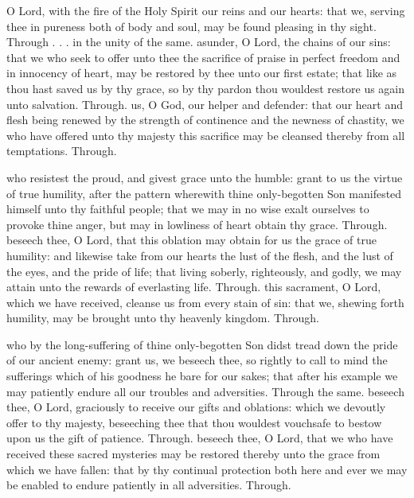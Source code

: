 \begin{multicols}{2}
 O Lord, with the fire of the Holy Spirit our reins and our hearts: that we, serving thee in pureness both of body and soul, may be found pleasing in thy sight. Through . . . in the unity of the same.
 asunder, O Lord, the chains of our sins: that we who seek to offer unto thee the sacrifice of praise in perfect freedom and in innocency of heart, may be restored by thee unto our first estate; that like as thou hast saved us by thy grace, so by thy pardon thou wouldest restore us again unto salvation. Through.
 us, O God, our helper and defender: that our heart and flesh being renewed by the strength of continence and the newness of chastity, we who have offered unto thy majesty this sacrifice may be cleansed thereby from all temptations. Through.

 who resistest the proud, and givest grace unto the humble: grant to us the virtue of true humility, after the pattern wherewith thine only-begotten Son manifested himself unto thy faithful people; that we may in no wise exalt ourselves to provoke thine anger, but may in lowliness of heart obtain thy grace. Through.
 beseech thee, O Lord, that this oblation may obtain for us the grace of true humility: and likewise take from our hearts the lust of the flesh, and the lust of the eyes, and the pride of life; that living soberly, righteously, and godly, we may attain unto the rewards of everlasting life. Through.
 this sacrament, O Lord, which we have received, cleanse us from every stain of sin: that we, shewing forth humility, may be brought unto thy heavenly kingdom. Through.

 who by the long-suffering of thine only-begotten Son didst tread down the pride of our ancient enemy: grant us, we beseech thee, so rightly to call to mind the sufferings which of his goodness he bare for our sakes; that after his example we may patiently endure all our troubles and adversities. Through the same.
 beseech thee, O Lord, graciously to receive our gifts and oblations: which we devoutly offer to thy majesty, beseeching thee that thou wouldest vouchsafe to bestow upon us the gift of patience. Through.
 beseech thee, O Lord, that we who have received these sacred mysteries may be restored thereby unto the grace from which we have fallen: that by thy continual protection both here and ever we may be enabled to endure patiently in all adversities. Through.


\end{multicols}
